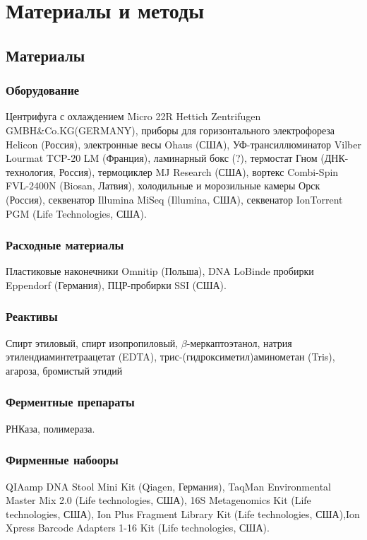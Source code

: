 \chapter{Материалы и методы} \label{chapt1}

\section{Материалы} \label{sect1_1}

\subsection{Оборудование}

Центрифуга с охлаждением Micro 22R Hettich Zentrifugen GMBH\&Co.KG(GERMANY), приборы для горизонтального электрофореза Helicon (Россия), электронные весы Ohaus (США), УФ-трансиллюминатор Vilber Lourmat TCP-20 LM (Франция), ламинарный бокс (?), термостат Гном (ДНК-технология, Россия), термоциклер MJ Research (США), вортекс Combi-Spin FVL-2400N (Biosan, Латвия), холодильные и морозильные камеры Орск (Россия), секвенатор Illumina MiSeq (Illumina, США), секвенатор IonTorrent PGM (Life Technologies, США).

\subsection{Расходные материалы}
Пластиковые наконечники Omnitip (Польша), DNA LoBinde пробирки Eppendorf (Германия), ПЦР-пробирки SSI (США).

\subsection{Реактивы}
Спирт этиловый, спирт изопропиловый, $\beta$-меркаптоэтанол, натрия этилендиаминтетраацетат (EDTA), трис-(гидроксиметил)аминометан (Tris), агароза, бромистый этидий

\subsection{Ферментные препараты}
РНКаза, полимераза.

\subsection{Фирменные набооры}
QIAamp DNA Stool Mini Kit (Qiagen, Германия), TaqMan Environmental Master Mix 2.0 (Life technologies, США), 16S Metagenomics Kit (Life technologies, США),  Ion Plus Fragment Library Kit (Life technologies, США),Ion Xpress Barcode Adapters 1-16 Kit (Life technologies, США).


